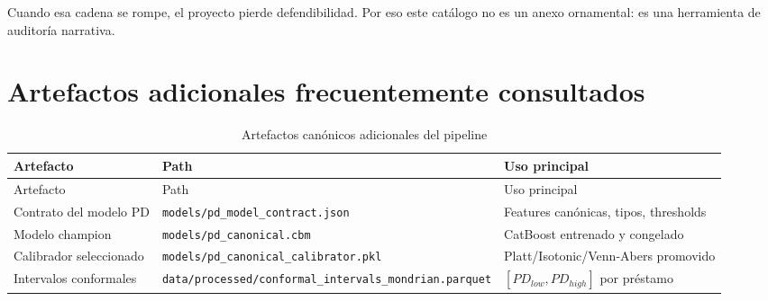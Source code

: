 \documentclass[
  spanish,
  11pt,
  letterpaper,
]{scrbook}
\theoremstyle{plain}
\theoremstyle{remark}
\begin{document}
Cuando esa cadena se rompe, el proyecto pierde defendibilidad. Por eso
este catálogo no es un anexo ornamental: es una herramienta de auditoría
narrativa.

\section{Artefactos adicionales frecuentemente
consultados}\label{artefactos-adicionales-frecuentemente-consultados}

\begin{longtable}[]{@{}
  >{\raggedright\arraybackslash}p{}
  >{\raggedright\arraybackslash}p{}
  >{\raggedright\arraybackslash}p{}@{}}
\caption{Artefactos canónicos adicionales del
pipeline}\label{tbl-additional-artifacts}\tabularnewline
\toprule\noalign{}
\begin{minipage}[b]{\linewidth}\raggedright
Artefacto
\end{minipage} & \begin{minipage}[b]{\linewidth}\raggedright
Path
\end{minipage} & \begin{minipage}[b]{\linewidth}\raggedright
Uso principal
\end{minipage} \\
\midrule\noalign{}
\endfirsthead
\toprule\noalign{}
\begin{minipage}[b]{\linewidth}\raggedright
Artefacto
\end{minipage} & \begin{minipage}[b]{\linewidth}\raggedright
Path
\end{minipage} & \begin{minipage}[b]{\linewidth}\raggedright
Uso principal
\end{minipage} \\
\midrule\noalign{}
\endhead
\bottomrule\noalign{}
\endlastfoot
Contrato del modelo PD & \texttt{models/pd\_model\_contract.json} &
Features canónicas, tipos, thresholds \\
Modelo champion & \texttt{models/pd\_canonical.cbm} & CatBoost entrenado
y congelado \\
Calibrador seleccionado & \texttt{models/pd\_canonical\_calibrator.pkl}
& Platt/Isotonic/Venn-Abers promovido \\
Intervalos conformales &
\texttt{data/processed/conformal\_intervals\_mondrian.parquet} &
\([PD_{low}, PD_{high}]\) por préstamo \\

\end{longtable}
\end{document}
